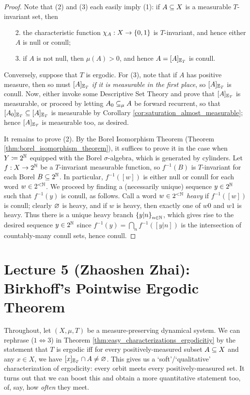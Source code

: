 \documentclass[reqno, twoside]{article}
\begin{document}
    \begin{proof}
        Note that (2) and (3) each easily imply (1): if $A\subseteq X$ is a measurable $T$-invariant set, then
        \begin{enumerate}
            \item[2.] the characteristic function $\chi_A:X\to\left\{0,1\right\}$ is $T$-invariant, and hence either $A$ is null or conull;
                \vspace{-0.05in}
            \item[3.] if $A$ is not null, then $\mu(A)>0$, and hence $A=[A]_{\mathbb{E}_T}$ is conull.
        \end{enumerate}
        Conversely, suppose that $T$ is ergodic. For (3), note that if $A$ has positive measure, then so must $[A]_{\mathbb{E}_T}$ \textit{if it is measurable in the first place}, so $[A]_{\mathbb{E}_T}$ is conull. Now, either invoke some Descriptive Set Theory and prove that $[A]_{\mathbb{E}_T}$ is measurable, or proceed by letting $A_0\subseteq_\mu A$ be forward recurrent, so that $[A_0]_{\mathbb{E}_T}\subseteq[A]_{\mathbb{E}_T}$ is measurable by Corollary \ref{cor:saturation_almost_measurable}; hence $[A]_{\mathbb{E}_T}$ is measurable too, as desired.

        It remains to prove (2). By the Borel Isomorphism Theorem (Theorem \ref{thm:borel_isomorphism_theorem}), it suffices to prove it in the case when $Y\coloneqq2^{\mathbb{N}}$ equipped with the Borel $\sigma$-algebra, which is generated by cylinders. Let $f:X\to2^{\mathbb{N}}$ be a $T$-invariant measurable function, so $f^{-1}(B)$ is $T$-invariant for each Borel $B\subseteq2^{\mathbb{N}}$. In particular, $f^{-1}([w])$ is either null or conull for each word $w\in2^{<\mathbb{N}}$. We proceed by finding a (necessarily unique) sequence $y\in2^{\mathbb{N}}$ such that $f^{-1}(y)$ is conull, as follows. Call a word $w\in2^{<\mathbb{N}}$ \textit{heavy} if $f^{-1}([w])$ is conull; clearly $\varnothing$ is heavy, and if $w$ is heavy, then exactly one of $w0$ and $w1$ is heavy. Thus there is a unique heavy branch $\left\{y|n\right\}_{n\in\mathbb{N}}$, which gives rise to the desired sequence $y\in2^{\mathbb{N}}$ since $f^{-1}(y)=\bigcap_nf^{-1}([y|n])$ is the intersection of countably-many conull sets, hence conull.
    \end{proof}

    \section{Lecture 5 (Zhaoshen Zhai): Birkhoff's Pointwise Ergodic Theorem}\label{sec:5}

    Throughout, let $(X,\mu,T)$ be a measure-preserving dynamical system. We can rephrase ($1\Leftrightarrow3$) in Theorem \ref{thm:easy_characterizations_ergodicitiy} by the statement that $T$ is ergodic iff for every positively-measured subset $A\subseteq X$ and any $x\in X$, we have $[x]_{\mathbb{E}_T}\cap A\neq\varnothing$. This gives us a `soft'/`qualitative' characterization of ergodicity: every orbit meets every positively-measured set. It turns out that we can boost this and obtain a more quantitative statement too, of, say, how \textit{often} they meet.
\end{document}
